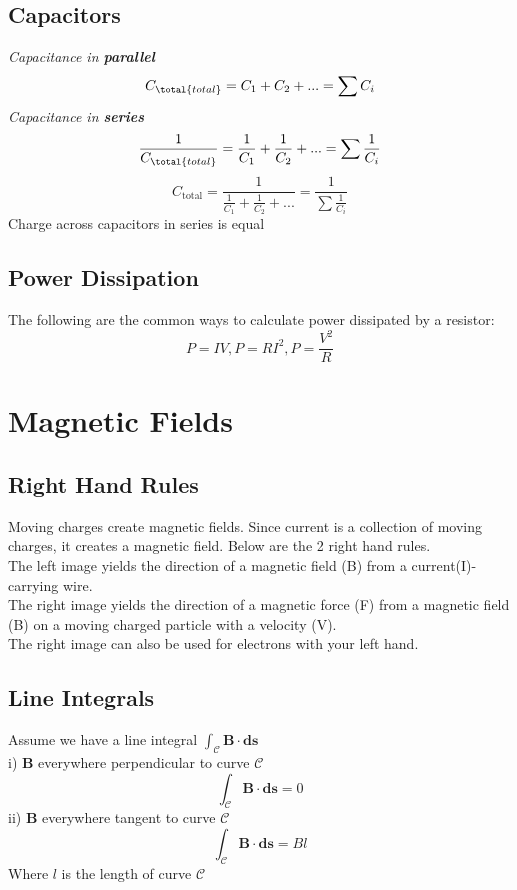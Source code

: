 \subsection{Capacitors}
\emph{Capacitance in \textbf{parallel}}
$$C_{\total{total}} = C_1 + C_2 + ... = \sum C_i$$
\emph{Capacitance in \textbf{series}}
$$\frac{1}{C_{\total{total}}}=\frac{1}{C_1} + \frac{1}{C_2} + ...=\sum\frac{1}{C_i}$$
$$C_{\text{total}}=\frac{1}{\frac{1}{C_1} + \frac{1}{C_2} + ...}=\frac{1}{\sum\frac{1}{C_i}}$$
Charge across capacitors in series is equal
\subsection{Power Dissipation}
The following are the common ways to calculate power dissipated by a resistor:
$$P=IV, P=RI^2, P=\frac{V^2}{R}$$
\section{Magnetic Fields}
\subsection{Right Hand Rules}
Moving charges create magnetic fields. Since current is a collection of moving charges, it creates a magnetic field. Below are the 2 right hand rules. \\
The left image yields the direction of a magnetic field (B) from a current(I)-carrying wire. \\
The right image yields the direction of a magnetic force (F) from a magnetic field (B) on a moving charged particle with a velocity (V). \\
The right image can also be used for electrons with your left hand.
\begin{figure}[H]
    \centering
    
    
\end{figure}
\subsection{Line Integrals}
Assume we have a line integral $\int_\mathcal{C} \mathbf{B}\cdot \mathbf{ds}$\\
i) $\mathbf{B}$ everywhere perpendicular to curve $\mathcal{C}$
$$\int_\mathcal{C}\mathbf{B}\cdot\mathbf{ds} = 0$$
ii) $\mathbf{B}$ everywhere tangent to curve $\mathcal{C}$
$$\int_\mathcal{C}\mathbf{B}\cdot\mathbf{ds} = Bl$$
Where $l$ is the length of curve $\mathcal{C}$

